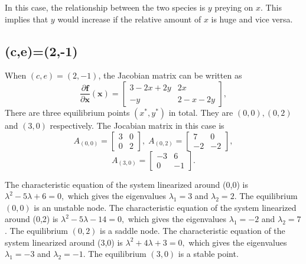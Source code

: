 \documentclass[a4paper,twocolumn]{article} %
\begin{document}
In this case, the relationship between the two species is $y$ preying on $x$. This implies that $y$ would increase if the relative amount of $x$ is huge and vice versa.

\subsection{(c,e)=(2,-1)}
When $(c,e)=(2,-1)$, the Jacobian matrix can be written as
\begin{equation*}
    \frac{\partial\textbf{f}}{\partial \textbf{x}}(\textbf{x}) =
    \left[\begin{array}{cc}
    3-2x+2y & 2x \\
    -y & 2-x-2y
    \end{array}\right],
\end{equation*}
There are three equilibrium points $(x^*,y^*)$ in total. They are $(0,0),(0,2)$ and $(3,0)$ respectively. The Jocabian matrix in this case is
\begin{equation*}
    A_{(0,0)} =
    \left[\begin{array}{cc}
    3 & 0 \\
    0 & 2
    \end{array}\right], \; A_{(0,2)} =
    \left[\begin{array}{cc}
    7 & 0 \\
    -2 & -2
    \end{array}\right],   
    \end{equation*}
    \begin{equation*}
    A_{(3,0)} =
    \left[\begin{array}{cc}
    -3 & 6 \\
    0 & -1
    \end{array}\right].
\end{equation*}

The characteristic equation of the system linearized around \mbox{(0,0)} is
$\lambda^2 -5 \lambda + 6 = 0,$ which gives the eigenvalues $\lambda_{1} = 3$ and $\lambda_{2} = 2$. The equilibrium $(0,0)$ is an unstable node. 
The characteristic equation of the system linearized around \mbox{(0,2)} is
$\lambda^2 -5 \lambda - 14 = 0,$ which gives the eigenvalues $\lambda_1 = -2$ and $\lambda_2 = 7$. The equilibrium $(0,2)$ is a saddle node. 
The characteristic equation of the system linearized around \mbox{(3,0)} is
$\lambda^2 +4 \lambda + 3 = 0,$ which gives the eigenvalues $\lambda_1 = -3$ and $\lambda_2 = -1$. The equilibrium $(3,0)$ is a stable point.
\end{document}
